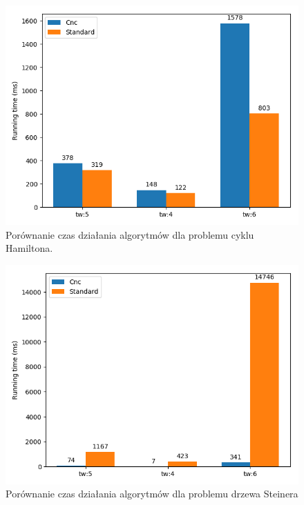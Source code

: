 \documentclass[12pt, oneside]{report}
\begin{document}
\begin{figure}
\centering
\includegraphics[width=16cm]{hamiltonian_test_time.png}
\caption{Porównanie czas działania algorytmów dla problemu cyklu Hamiltona.}
\label{hamiltonian_test_time}
\end{figure}

\begin{figure}
\centering
\includegraphics[width=16cm]{steiner_test_time.png}
\caption{Porównanie czas działania algorytmów dla problemu drzewa Steinera}
\label{steiner_test_time}
\end{figure}
\end{document}
